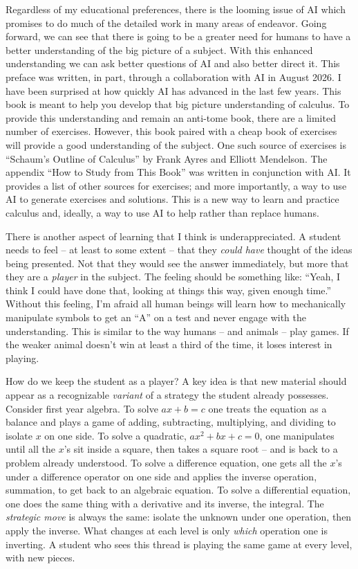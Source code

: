 Regardless of my educational preferences, there is the looming
issue of AI which promises to do much of the detailed work in many areas of
endeavor. Going forward, we can see that there is going to be a greater 
need for humans to have a better 
understanding of the big picture of a subject. With this enhanced understanding
we can ask better questions of AI and also better direct it. 
This preface was written, in part, through a collaboration with AI in August 2026.
I have been surprised at how quickly AI has
advanced in the last few years. This book is meant to help you develop that
big picture understanding of calculus.
To provide this understanding and remain an anti-tome book, there are a limited 
number of exercises. However, this book paired with a cheap book of exercises will provide a good understanding of the subject.
One such source of exercises is ``Schaum's Outline of Calculus'' by Frank Ayres and Elliott Mendelson.
The appendix ``How to Study from This Book'' was written in conjunction with AI. It provides a list of other sources for exercises; and more importantly,
a way to use AI to generate exercises and solutions. This is a new way to learn and practice calculus
and, ideally, a way to use AI to help rather than replace humans.

There is another aspect of learning that I think is underappreciated.
A student needs to feel -- at least to some extent -- that 
they {\it could have\/} thought of the ideas being presented. Not that 
they would see the answer immediately, but more that they are a 
{\it player\/} in the subject. The feeling should be something like: 
``Yeah, I think I could have done that, looking at things this way, 
given enough time.'' Without this feeling, I'm afraid all human beings 
will learn how to mechanically manipulate symbols to get an ``A'' 
on a test and never engage with the understanding.
This is similar to the way humans -- and animals -- play games. If the 
weaker animal doesn't win at least a third of the time, it loses interest in 
playing. 

How do we keep the student as a player? A key 
idea is that new material should appear as a recognizable 
{\it variant\/} of a strategy the student already possesses. 
Consider first year algebra. To solve 
$a x + b = c$ one treats the equation as a balance and plays a game of 
adding, subtracting, multiplying, and dividing to isolate $x$ on one 
side. To solve a quadratic, $a x^2 + b x + c = 0$, one manipulates 
until all the $x$'s sit inside a square, then takes a square root -- and 
is back to a problem already understood. To solve a difference equation, 
one gets all the $x$'s under a difference operator on one side and applies 
the inverse operation, summation, to get back to an algebraic equation. 
To solve a differential equation, one does the same thing with a derivative 
and its inverse, the integral. The {\it strategic move\/} is always the 
same: isolate the unknown under one operation, then apply the inverse.
What changes at each level is only {\it which\/} operation one is inverting. 
A student who sees this thread is playing the same game at every level, 
with new pieces.


